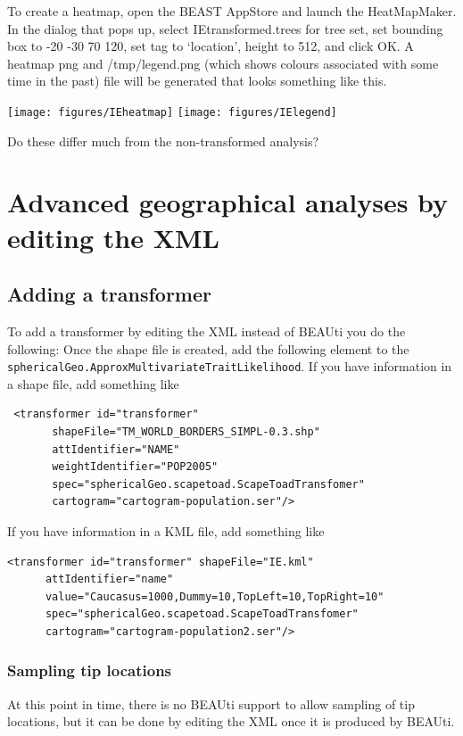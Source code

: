 \documentclass{article}
\begin{document}
To create a heatmap, open the BEAST AppStore and launch the HeatMapMaker. In the dialog that pops up, select IEtransformed.trees for tree set, set bounding box to -20 -30 70 120, set tag to `location', height to 512,  and click OK. A heatmap png and /tmp/legend.png (which shows colours associated with some time in the past) file will be generated that looks something like this.

\texttt{[image: figures/IEheatmap]}
\texttt{[image: figures/IElegend]}

Do these differ much from the non-transformed analysis?

\section*{Advanced geographical analyses by editing the XML}
\subsection*{Adding a transformer}
To add a transformer by editing the XML instead of BEAUti you do the following: Once the shape file is created, add the following element to the {\tt sphericalGeo.ApproxMultivariateTraitLikelihood}. If you have information in a shape file, add something like

\begin{verbatim}
 <transformer id="transformer" 
       shapeFile="TM_WORLD_BORDERS_SIMPL-0.3.shp" 
       attIdentifier="NAME" 
       weightIdentifier="POP2005" 
       spec="sphericalGeo.scapetoad.ScapeToadTransfomer"
       cartogram="cartogram-population.ser"/> 
 \end{verbatim}

If you have information in a KML file, add something like

\begin{verbatim}
<transformer id="transformer" shapeFile="IE.kml"
      attIdentifier="name"
      value="Caucasus=1000,Dummy=10,TopLeft=10,TopRight=10"
      spec="sphericalGeo.scapetoad.ScapeToadTransfomer"
      cartogram="cartogram-population2.ser"/>
\end{verbatim}

\subsubsection*{Sampling tip locations}
At this point in time, there is no BEAUti support to allow sampling of tip locations, but it can be done by editing the XML once it is produced by BEAUti.
\end{document}
